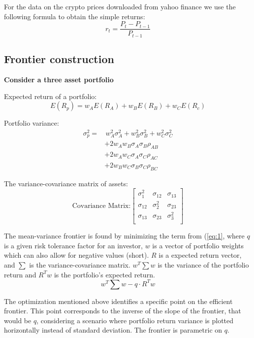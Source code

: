 \documentclass[12pt,a4paper]{article}
\begin{document}
\noindent For the data on the crypto prices downloaded from yahoo finance we use the following formula to obtain the simple 
returns: 
$$r_t = \frac{P_t-P_{t-1}}{P_{t-1}}$$

\subsection{Frontier construction}
\textbf{Consider a three asset portfolio}

Expected return of a portfolio:
$$E(R_p) = w_AE(R_A) + w_BE(R_B) + w_CE(R_c)$$

Portfolio variance: 
\begin{align*} %
\sigma^2_p = & \, w^2_A\sigma^2_A + w^2_B\sigma^2_B + w^2_C\sigma^2_C \\
            & + 2w_A w_B\sigma_A\sigma_B\rho_{AB} \\
            & + 2w_A w_C\sigma_A\sigma_C\rho_{AC} \\
            & + 2w_B w_C\sigma_B\sigma_C\rho_{BC}
\end{align*}


The variance-covariance matrix of assets: 
\[
\text{Covariance Matrix:}
\begin{bmatrix}
    \sigma_{1}^2 & \sigma_{12} & \sigma_{13} \\
    \sigma_{12} & \sigma_{2}^2 & \sigma_{23} \\
    \sigma_{13} & \sigma_{23} & \sigma_{3}^2 \\
\end{bmatrix}
\]

\noindent The mean-variance frontier is found by minimizing the term from (\ref{eq:1}, where $q$ is a given risk tolerance 
factor for an investor, $w$ is a vector of portfolio weights which can also allow for negative values (short). $R$ is a 
expected return vector, and $\sum$ is the variance-covariance matrix. $w^T\sum w$ is the variance of the portfolio return 
and $R^Tw$ is the portfolio's expected return.\cite{wikiref}
\begin{equation}\label{eq:1}
 w^T\sum w - q \cdot R^Tw    
\end{equation}

\noindent The optimization mentioned above identifies a specific point on the efficient frontier. This point corresponds to 
the inverse of the slope of the frontier, that would be $q$, considering a scenario where portfolio return variance is plotted
 horizontally instead of standard deviation. The frontier is parametric on $q$.\cite{wikiref}
\end{document}
